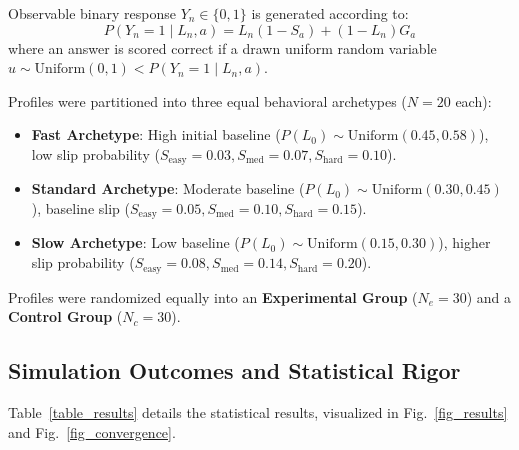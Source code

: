 \documentclass[journal]{IEEEtran}
\begin{document}
Observable binary response $Y_n \in \{0, 1\}$ is generated according to:
\begin{equation}
P(Y_n = 1 \mid L_n, a) = L_n(1 - S_a) + (1 - L_n)G_a
\end{equation}
where an answer is scored correct if a drawn uniform random variable $u \sim \text{Uniform}(0, 1) < P(Y_n = 1 \mid L_n, a)$.

Profiles were partitioned into three equal behavioral archetypes ($N=20$ each):
\begin{itemize}
    \item \textbf{Fast Archetype}: High initial baseline ($P(L_0) \sim \text{Uniform}(0.45, 0.58)$), low slip probability ($S_{\text{easy}}=0.03, S_{\text{med}}=0.07, S_{\text{hard}}=0.10$).
    \item \textbf{Standard Archetype}: Moderate baseline ($P(L_0) \sim \text{Uniform}(0.30, 0.45)$), baseline slip ($S_{\text{easy}}=0.05, S_{\text{med}}=0.10, S_{\text{hard}}=0.15$).
    \item \textbf{Slow Archetype}: Low baseline ($P(L_0) \sim \text{Uniform}(0.15, 0.30)$), higher slip probability ($S_{\text{easy}}=0.08, S_{\text{med}}=0.14, S_{\text{hard}}=0.20$).
\end{itemize}

Profiles were randomized equally into an \textbf{Experimental Group} ($N_e=30$) and a \textbf{Control Group} ($N_c=30$).

\subsection{Simulation Outcomes and Statistical Rigor}
Table~\ref{table_results} details the statistical results, visualized in Fig.~\ref{fig_results} and Fig.~\ref{fig_convergence}.
\end{document}
